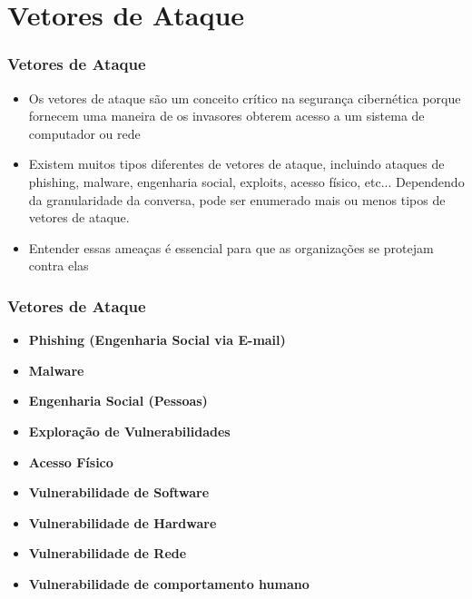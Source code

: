 \section{Vetores de Ataque}
\begin{frame}
  \frametitle{Vetores de Ataque}
  \begin{itemize}
    \item Os vetores de ataque são um conceito crítico na segurança cibernética porque fornecem uma maneira de os invasores obterem acesso a um sistema de computador ou rede
    \item Existem muitos tipos diferentes de vetores de ataque, incluindo ataques de phishing, malware, engenharia social, exploits, acesso físico, etc... Dependendo da granularidade da conversa, pode ser enumerado mais ou menos tipos de vetores de ataque.
    \item Entender essas ameaças é essencial para que as organizações se protejam contra elas
  \end{itemize}
\end{frame}

\begin{frame}
  \frametitle{Vetores de Ataque}
  \begin{multicols}{2}
    \begin{itemize}
      \item \textbf{Phishing (Engenharia Social via E-mail)}
      \item \textbf{Malware}
      \item \textbf{Engenharia Social (Pessoas)}
      \item \textbf{Exploração de Vulnerabilidades}
      \item \textbf{Acesso Físico}
    \end{itemize}
    \begin{itemize}
      \item \textbf{Vulnerabilidade de Software}
      \item \textbf{Vulnerabilidade de Hardware}
      \item \textbf{Vulnerabilidade de Rede}
      \item \textbf{Vulnerabilidade de comportamento humano}
    \end{itemize}
  \end{multicols}
\end{frame}
